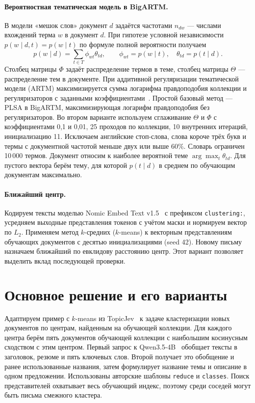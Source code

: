 \documentclass[11pt,a4paper]{article}
\begin{document}
\paragraph{Вероятностная тематическая модель в BigARTM.} В модели «мешок слов» документ $d$ задаётся частотами $n_{dw}$ --- числами вхождений терма $w$ в документ $d$. При гипотезе условной независимости $p(w\mid d,t)=p(w\mid t)$ по формуле полной вероятности получаем
\[
 p(w\mid d)=\sum_{t\in T}\phi_{wt}\theta_{td},
 \qquad \phi_{wt}=p(w\mid t),\quad \theta_{td}=p(t\mid d).
\]
Столбец матрицы $\Phi$ задаёт распределение термов в теме, столбец матрицы $\Theta$ --- распределение тем в документе. При аддитивной регуляризации тематической модели (ARTM) максимизируется сумма логарифма правдоподобия коллекции и регуляризаторов с заданными коэффициентами~\cite{course,artm}. Простой базовый метод --- PLSA в BigARTM, максимизирующая логарифм правдоподобия без регуляризаторов. Во втором варианте используем сглаживание $\Theta$ и $\Phi$ с коэффициентами 0,1 и 0,01, 25 проходов по коллекции, 10 внутренних итераций, инициализацию 11. Исключаем английские стоп-слова, слова короче трёх букв и термы с документной частотой меньше двух или выше 60\%. Словарь ограничен 10\,000 термов. Документ относим к наиболее вероятной теме $\arg\max_t\theta_{td}$. Для пустого вектора берём тему, для которой $p(t\mid d)$ в среднем по обучающим документам максимально.
\paragraph{Ближайший центр.} Кодируем тексты моделью Nomic Embed Text v1.5~\cite{nomic} с префиксом \texttt{clustering:}, усредняем выходные представления токенов с учётом маски и нормируем вектор по $L_2$. Применяем метод $k$-средних ($k$-means) к векторным представлениям обучающих документов с десятью инициализациями (seed 42). Новому письму назначаем ближайший по евклидову расстоянию центр. Этот вариант позволяет выделить вклад последующей проверки.

\section{Основное решение и его варианты}
Адаптируем пример с $k$-means из TopicJev~\cite{topicjev} к задаче кластеризации новых документов по центрам, найденным на обучающей коллекции. Для каждого центра берём пять документов обучающей коллекции с наибольшим косинусным сходством с этим центром. Первый запрос к Qwen3.5-4B~\cite{qwen} обобщает тексты в заголовок, резюме и пять ключевых слов. Второй получает это обобщение и ранее использованные названия, затем формулирует название темы и описание в одном предложении. Использованы авторские шаблоны \texttt{reduce} и \texttt{classes}. Поиск представителей охватывает весь обучающий индекс, поэтому среди соседей могут быть письма смежного кластера.
\end{document}
